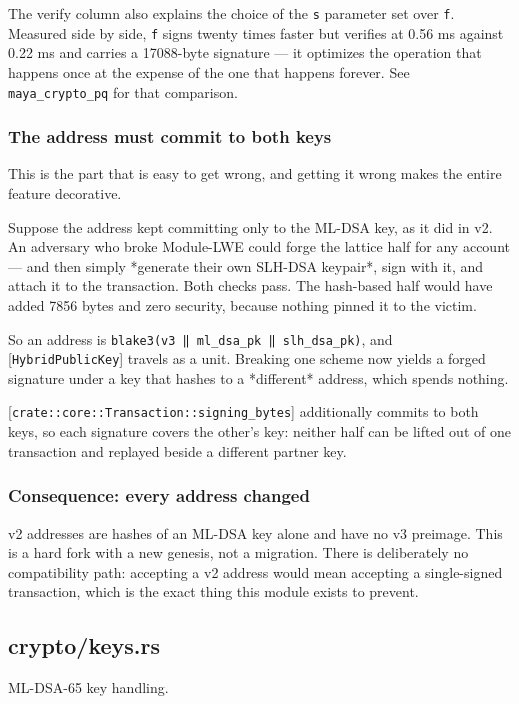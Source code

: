\documentclass[11pt,a4paper]{article}
\begin{document}
The verify column also explains the choice of the \texttt{s} parameter set over
\texttt{f}. Measured side by side, \texttt{f} signs twenty times faster but verifies at
0.56 ms against 0.22 ms and carries a 17088-byte signature — it optimizes
the operation that happens once at the expense of the one that happens
forever. See \texttt{maya\_crypto\_pq} for that comparison.

\subsubsection{The address must commit to both keys}

This is the part that is easy to get wrong, and getting it wrong makes the
entire feature decorative.

Suppose the address kept committing only to the ML-DSA key, as it did in v2.
An adversary who broke Module-LWE could forge the lattice half for any
account — and then simply *generate their own SLH-DSA keypair*, sign with
it, and attach it to the transaction. Both checks pass. The hash-based half
would have added 7856 bytes and zero security, because nothing pinned it to
the victim.

So an address is \texttt{blake3(v3 ‖ ml\_dsa\_pk ‖ slh\_dsa\_pk)}, and
[\texttt{HybridPublicKey}] travels as a unit. Breaking one scheme now yields a
forged signature under a key that hashes to a *different* address, which
spends nothing.

[\texttt{crate::core::Transaction::signing\_bytes}] additionally commits to both
keys, so each signature covers the other's key: neither half can be lifted
out of one transaction and replayed beside a different partner key.

\subsubsection{Consequence: every address changed}

v2 addresses are hashes of an ML-DSA key alone and have no v3 preimage. This
is a hard fork with a new genesis, not a migration. There is deliberately no
compatibility path: accepting a v2 address would mean accepting a
single-signed transaction, which is the exact thing this module exists to
prevent.

\subsection{crypto/keys.rs}
ML-DSA-65 key handling.
\end{document}
